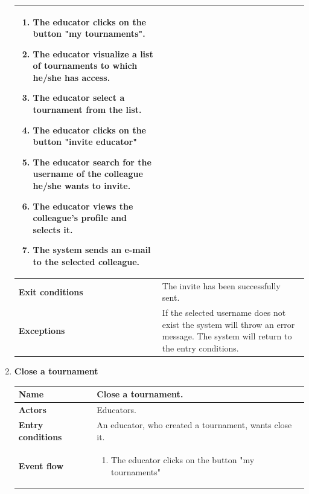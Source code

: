 \begin{enumerate}[label=\textbf{UC.\arabic*}]
\begin{table}[H]
\begin{tabular}{|m{3.2cm}|m{9.8cm}|}
                    \begin{enumerate}[label=\arabic*.]
                        \item The educator clicks on the button "my tournaments".
                        \item The educator visualize a list of tournaments to which he/she has access.
                        \item The educator select a tournament from the list.
                        \item The educator clicks on the button "invite educator"
                        \item The educator search for the username of the colleague he/she wants to invite.
                        \item The educator views the colleague's profile and selects it.
                        \item The system sends an e-mail to the selected colleague.
                    \end{enumerate}\\
                    \hline
                    \textbf{Exit conditions}  & The invite has been successfully sent. \\
                    \hline
                    \textbf{Exceptions} & If the selected username does not exist the system will throw an error message. The system will return to the entry conditions.
                \end{tabular}
        \end{table}
        \item {} \textbf{Close a tournament}
        \begin{table}[H]
    	    \centering
                \renewcommand{\arraystretch}{1.5}
                \begin{tabular}{|m{3.2cm}|m{9.8cm}|}
                    \hline
                    \textbf{Name} & Close a tournament. \\
                    \hline
                    \textbf{Actors} & Educators. \\
                    \hline
                    \textbf{Entry conditions}  &  An educator, who created a tournament, wants close it. \\
                    \hline
                    \textbf{Event flow}  & 
                    \begin{enumerate}[label=\arabic*.]
                        \item The educator clicks on the button "my tournaments"

\end{enumerate}
\end{tabular}
\end{table}
\end{enumerate}
